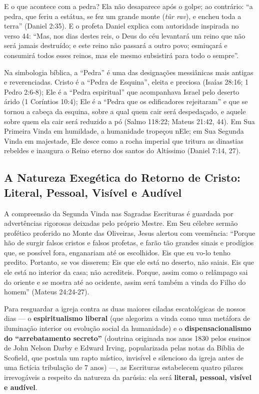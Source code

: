 \documentclass[11pt,a4paper,openany]{book}
\begin{document}
E o que acontece com a pedra? Ela não desaparece após o golpe; ao contrário:
``a pedra, que feriu a estátua, se fez um grande monte (\textit{tûr rav}), e encheu toda a terra'' (Daniel 2:35).
E o profeta Daniel explica com autoridade inspirada no verso 44:
``Mas, nos dias destes reis, o Deus do céu levantará um reino que não será jamais destruído; e este reino não passará a outro povo; esmiuçará e consumirá todos esses reinos, mas ele mesmo subsistirá para todo o sempre''.

Na simbologia bíblica, a ``Pedra'' é uma das designações messiânicas mais antigas e reverenciadas. Cristo é a ``Pedra de Esquina'', eleita e preciosa (Isaías 28:16; 1 Pedro 2:6-8); Ele é a ``Pedra espiritual'' que acompanhava Israel pelo deserto árido (1 Coríntios 10:4); Ele é a ``Pedra que os edificadores rejeitaram'' e que se tornou a cabeça da esquina, sobre a qual quem cair será despedaçado, e aquele sobre quem ela cair será reduzido a pó (Salmo 118:22; Mateus 21:42, 44). Em Sua Primeira Vinda em humildade, a humanidade tropeçou nEle; em Sua Segunda Vinda em majestade, Ele desce como a rocha imperial que tritura as dinastias rebeldes e inaugura o Reino eterno dos santos do Altíssimo (Daniel 7:14, 27).



\subsection{A Natureza Exegética do Retorno de Cristo: Literal, Pessoal, Visível e Audível}


A compreensão da Segunda Vinda nas Sagradas Escrituras é guardada por advertências rigorosas deixadas pelo próprio Mestre. Em Seu célebre sermão profético proferido no Monte das Oliveiras, Jesus alertou com veemência:
``Porque hão de surgir falsos cristos e falsos profetas, e farão tão grandes sinais e prodígios que, se possível fora, enganariam até os escolhidos. Eis que eu vo-lo tenho predito. Portanto, se vos disserem: Eis que ele está no deserto, não saiais. Eis que ele está no interior da casa; não acrediteis. Porque, assim como o relâmpago sai do oriente e se mostra até ao ocidente, assim será também a vinda do Filho do homem'' (Mateus 24:24-27).

Para resguardar a igreja contra as duas maiores ciladas escatológicas de nossos dias — o \textbf{espiritualismo liberal} (que alegoriza a vinda como uma metáfora de iluminação interior ou evolução social da humanidade) e o \textbf{dispensacionalismo do ``arrebatamento secreto''} (doutrina originada nos anos 1830 pelos ensinos de John Nelson Darby e Edward Irving, popularizada pelas notas da Bíblia de Scofield, que postula um rapto místico, invisível e silencioso da igreja antes de uma fictícia tribulação de 7 anos) —, as Escrituras estabelecem quatro pilares irrevogáveis a respeito da natureza da parúsia: ela será \textbf{literal, pessoal, visível e audível}.
\end{document}
